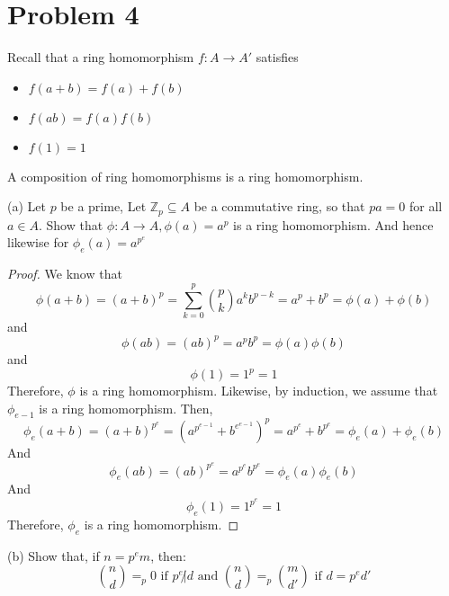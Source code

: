 \documentclass{article}
\begin{document}
\section*{Problem 4}
Recall that a ring homomorphism $f: A\to A'$ satisfies
\begin{itemize}
    \item $f(a + b) = f(a) + f(b)$
    \item $f(ab) = f(a)f(b)$
    \item $f(1) = 1$
\end{itemize}
A composition of ring homomorphisms is a ring homomorphism.

(a) Let $p$ be a prime, Let $\mathbb{Z}_p\subseteq A$ be a commutative ring, so that $pa=0$ for all $a\in A$.
Show that $\phi: A\to A, \phi(a)=a^p$ is a ring homomorphism. And hence likewise for $\phi_{e}(a) = a^{p^e}$

\begin{proof}
    We know that 
    \begin{equation*}
        \phi(a + b) = (a + b)^p = \sum_{k=0}^{p} \binom{p}{k} a^kb^{p-k} = a^p + b^p = \phi(a) + \phi(b)
    \end{equation*}
    and
    \begin{equation*}
        \phi(ab) = (ab)^p = a^pb^p = \phi(a)\phi(b)
    \end{equation*}
    and
    \begin{equation*}
        \phi(1) = 1^p = 1
    \end{equation*}
    Therefore, $\phi$ is a ring homomorphism.
    Likewise, by induction, we assume that $\phi_{e-1}$ is a ring homomorphism. Then,
    \begin{equation*}
        \phi_{e}(a + b) = (a + b)^{p^e} = \left(a^{p^{e-1}} + b^{e^{e-1}}\right)^p = a^{p^e} + b^{p^e} = \phi_{e}(a) + \phi_{e}(b)
    \end{equation*}
    And
    \begin{equation*}
        \phi_{e}(ab) = (ab)^{p^e} = a^{p^e}b^{p^e} = \phi_{e}(a)\phi_{e}(b)
    \end{equation*}
    And
    \begin{equation*}
        \phi_{e}(1) = 1^{p^e} = 1
    \end{equation*}
    Therefore, $\phi_{e}$ is a ring homomorphism.
\end{proof}

(b) Show that, if $n  =  p^em$, then:
\begin{equation*}
    \binom{n}{d} =_p 0 \text{ if } p^e \not | d \text{ and } \binom{n}{d} =_p \binom{m}{d'} \text{ if } d=p^ed'
\end{equation*}
\end{document}
